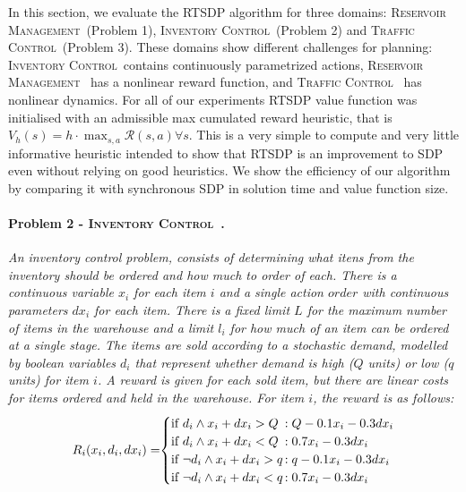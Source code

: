 \documentclass[letterpaper]{article}
\newcommand{\Invent}{\textsc{Inventory Control}}
\newcommand{\Traffic}{\textsc{Traffic Control}}
\newcommand{\Reservoir}{\textsc{Reservoir Management}}
\begin{document}
In this section, we evaluate the RTSDP algorithm for three domains: \Reservoir~(Problem 1), \Invent~(Problem 2) and \Traffic~(Problem 3). These domains show different challenges for planning: \Invent~contains continuously parametrized actions, \Reservoir~ has a nonlinear reward function, and \Traffic~ has nonlinear dynamics.
For all of our experiments RTSDP value function was initialised with an admissible max cumulated reward heuristic, that is $V_h(s) = h \cdot \max_{s,a} \mathcal{R}(s,a) \forall s$. This is a very simple to compute and very little informative heuristic intended to show that RTSDP is an improvement to SDP even without relying on good heuristics.
We show the efficiency of our algorithm by comparing it with synchronous SDP in solution time and value function size.

\paragraph{\bf Problem 2 - \Invent ~\cite{scarf2002}. \label{ex2}}
\textit{An inventory control problem, consists of determining what itens from the inventory should be ordered and how much to order of each. There is a continuous variable $x_i$ for each item $i$ and a single action $order$ with continuous parameters $dx_i$ for each item. There is a fixed limit $L$ for the maximum number of items in the warehouse and a limit $l_i$ for how much of an item can be ordered at a single stage. The items are sold according to a stochastic demand, modelled by boolean variables $d_i$ that represent whether demand is high ($Q$ units) or low ($q$ units) for item $i$. A reward is given for each sold item, but there are linear costs for items ordered and held in the warehouse. For item $i$, the reward is as follows:
{\small
\begin{align*}
R_{i} (x_i, d_i, dx_i)= \hspace{-1mm}
\begin{cases}
  \text{if }  d_i \wedge x_i + dx_i > Q &\hspace{-3mm} : Q - 0.1x_i - 0.3dx_i\\ 
  \text{if }  d_i \wedge x_i + dx_i < Q &\hspace{-3mm} : 0.7x_i - 0.3dx_i\\ 
  \text{if }  \neg d_i \wedge x_i + dx_i > q &\hspace{-3mm} : q - 0.1x_i - 0.3dx_i\\ 
  \text{if }  \neg d_i \wedge x_i+dx_i < q &\hspace{-3mm} : 0.7x_i - 0.3dx_i\\ 
\end{cases}
\end{align*}
}
}
\end{document}
